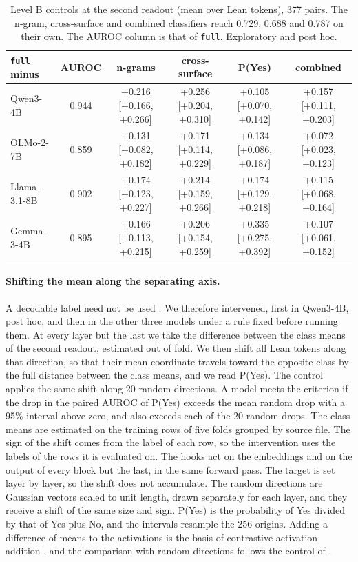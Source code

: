 \documentclass[10pt]{article}
\newcommand{\vr}[1]{\texttt{#1}}
\begin{document}
\begin{table}[h]
\centering
\caption{Level B controls at the second readout (mean over Lean tokens), 377 pairs. The n-gram, cross-surface and combined classifiers reach 0.729, 0.688 and 0.787 on their own. The AUROC column is that of \vr{full}. Exploratory and post hoc.}
\label{tab:bcontroles2}
\vspace{2pt}
{\footnotesize\setlength{\tabcolsep}{2pt}
\begin{tabular}{@{}lccccc@{}}
\toprule
\vr{full} minus & AUROC & n-grams & cross-surface & P(Yes) & combined\\
\midrule
Qwen3-4B     & 0.944 & +0.216 [+0.166, +0.266] & +0.256 [+0.204, +0.310] & +0.105 [+0.070, +0.142] & +0.157 [+0.111, +0.203]\\
OLMo-2-7B    & 0.859 & +0.131 [+0.082, +0.182] & +0.171 [+0.114, +0.229] & +0.134 [+0.086, +0.187] & +0.072 [+0.023, +0.123]\\
Llama-3.1-8B & 0.902 & +0.174 [+0.123, +0.227] & +0.214 [+0.159, +0.266] & +0.174 [+0.129, +0.218] & +0.115 [+0.068, +0.164]\\
Gemma-3-4B   & 0.895 & +0.166 [+0.113, +0.215] & +0.206 [+0.154, +0.259] & +0.335 [+0.275, +0.392] & +0.107 [+0.061, +0.152]\\
\bottomrule
\end{tabular}}
\end{table}

\paragraph{Shifting the mean along the separating axis.} A decodable label need not be used \citep{elazar2021amnesic}.
We therefore intervened, first in Qwen3-4B, post hoc, and then in the other three models under a rule
fixed before running them. At every layer but the last we take the difference between the class means of the second
readout, estimated out of fold. We then shift all Lean tokens along that direction, so that their mean coordinate
travels toward the opposite class by the full distance between the class means, and we read P(Yes). The control
applies the same shift along 20 random directions. A model meets the criterion if the drop in the paired AUROC of
P(Yes) exceeds the mean random drop with a 95\% interval above zero, and also exceeds each of the 20 random drops. The
class means are estimated on the training rows of five folds grouped by source file. The sign of the shift comes from
the label of each row, so the intervention uses the labels of the rows it is evaluated on. The hooks act on the
embeddings and on the output of every block but the last, in the same forward pass. The target is set layer by layer,
so the shift does not accumulate. The random directions are Gaussian vectors scaled to unit length, drawn separately
for each layer, and they receive a shift of the same size and sign. P(Yes) is the probability of Yes divided by that
of Yes plus No, and the intervals resample the 256 origins. Adding a difference of means to the activations is the
basis of contrastive activation addition \citep{rimsky2024steering}, and the comparison with random directions follows
the control of \citet{elazar2021amnesic}.
\end{document}
